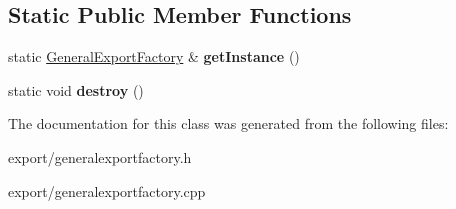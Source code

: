 \subsection*{Static Public Member Functions}
\begin{DoxyCompactItemize}
\item 
\hypertarget{class_general_export_factory_aaeddf4a7a56e9a95aa8c8b15cb2f35d1}{static \hyperlink{class_general_export_factory}{General\-Export\-Factory} \& {\bfseries get\-Instance} ()}\label{class_general_export_factory_aaeddf4a7a56e9a95aa8c8b15cb2f35d1}

\item 
\hypertarget{class_general_export_factory_ac9bdc900afd922cc7e1df866ecfd2c21}{static void {\bfseries destroy} ()}\label{class_general_export_factory_ac9bdc900afd922cc7e1df866ecfd2c21}

\end{DoxyCompactItemize}


The documentation for this class was generated from the following files\-:\begin{DoxyCompactItemize}
\item 
export/generalexportfactory.\-h\item 
export/generalexportfactory.\-cpp\end{DoxyCompactItemize}
